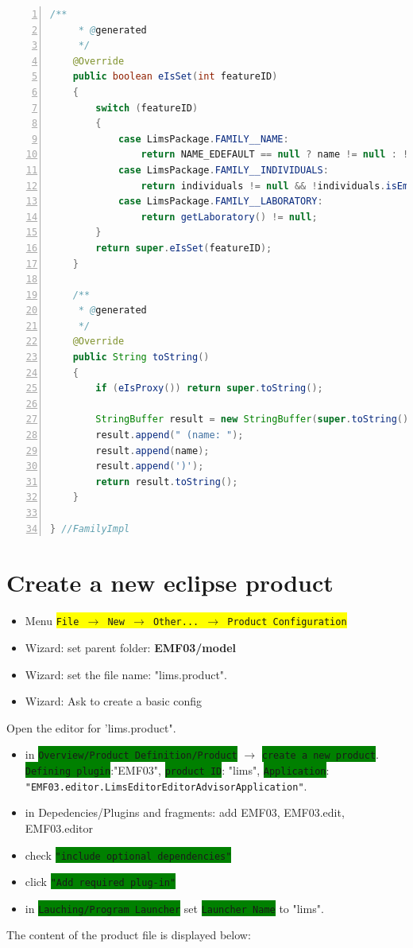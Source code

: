\documentclass{article}
\newcommand{\menu}[1]{\colorbox{yellow}{\texttt{#1}}}
\newcommand{\wizard}[1]{\colorbox{green}{\texttt{#1}}}
\begin{document}
\begin{lstlisting}[language=java,basicstyle=\tiny,breaklines=true,numbers=left]
	/**
	 * @generated
	 */
	@Override
	public boolean eIsSet(int featureID)
	{
		switch (featureID)
		{
			case LimsPackage.FAMILY__NAME:
				return NAME_EDEFAULT == null ? name != null : !NAME_EDEFAULT.equals(name);
			case LimsPackage.FAMILY__INDIVIDUALS:
				return individuals != null && !individuals.isEmpty();
			case LimsPackage.FAMILY__LABORATORY:
				return getLaboratory() != null;
		}
		return super.eIsSet(featureID);
	}

	/**
	 * @generated
	 */
	@Override
	public String toString()
	{
		if (eIsProxy()) return super.toString();

		StringBuffer result = new StringBuffer(super.toString());
		result.append(" (name: ");
		result.append(name);
		result.append(')');
		return result.toString();
	}

} //FamilyImpl
\end{lstlisting}

\section{Create a new eclipse product}
\begin{itemize}
\item Menu \menu{File $\rightarrow$  New  $\rightarrow$ Other... $\rightarrow$ Product Configuration}
\item Wizard: set parent folder: \textbf{EMF03/model}
\item Wizard: set the file name: "lims.product".
\item Wizard: Ask to create a basic config
\end{itemize}
Open the editor for 'lims.product".
\begin{itemize}
\item in  \wizard{Overview/Product Definition/Product} $\rightarrow$ \wizard{create a new product}.  \wizard{Defining plugin}:"EMF03",  \wizard{product ID}: "lims",  \wizard{Application}: \texttt{"EMF03.editor.LimsEditorEditorAdvisorApplication"}.
\item in Depedencies/Plugins and fragments: add EMF03, EMF03.edit, EMF03.editor
\item check \wizard{"include optional dependencies"}
\item click  \wizard{"Add required plug-in"}
\item in  \wizard{Lauching/Program Launcher} set  \wizard{Launcher Name} to "lims".
\end{itemize}

The content of the product file is displayed below:

\end{document}
